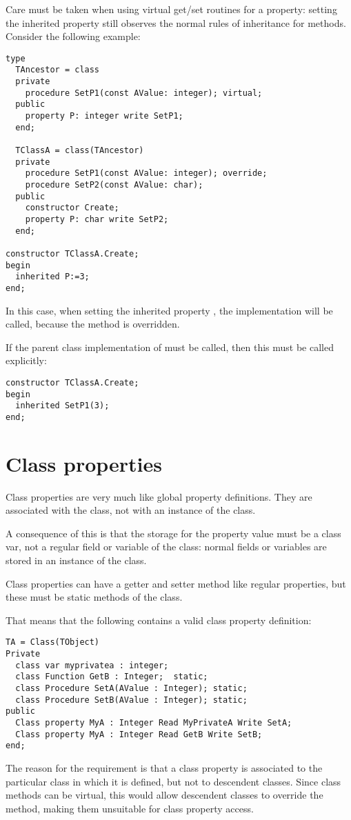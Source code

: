 Care must be taken when using virtual get/set routines for a property:
setting the inherited property still observes the normal rules of inheritance
for methods. Consider the following example:
\begin{verbatim}
type
  TAncestor = class
  private
    procedure SetP1(const AValue: integer); virtual;
  public
    property P: integer write SetP1;
  end;

  TClassA = class(TAncestor)
  private
    procedure SetP1(const AValue: integer); override;
    procedure SetP2(const AValue: char);
  public
    constructor Create;
    property P: char write SetP2;
  end;

constructor TClassA.Create;
begin
  inherited P:=3; 
end;
\end{verbatim}
In this case, when setting the inherited property , the
implementation  will be called, because the
 method is overridden.

If the parent class implementation of  must be called,
then this must be called explicitly:
\begin{verbatim}
constructor TClassA.Create;
begin
  inherited SetP1(3);
end;
\end{verbatim}

\section{Class properties}
Class properties are very much like global property definitions. They are
associated with the class, not with an instance of the class. 

A consequence of this is that the storage for the property value must be a
class var, not a regular field or variable of the class: normal fields or
variables are stored in an instance of the class.

Class properties can have a getter and setter method like regular
properties, but these must be static methods of the class. 

That means that the following contains a valid class property definition:
\begin{verbatim}
TA = Class(TObject)
Private
  class var myprivatea : integer;
  class Function GetB : Integer;  static;
  class Procedure SetA(AValue : Integer); static;
  class Procedure SetB(AValue : Integer); static;
public
  Class property MyA : Integer Read MyPrivateA Write SetA;
  Class property MyA : Integer Read GetB Write SetB;
end;
\end{verbatim}
The reason for the requirement is that a class property is associated to
the particular class in which it is defined, but not to descendent classes. 
Since class methods can be virtual, this would allow descendent classes 
to override the method, making them unsuitable for class property access.



